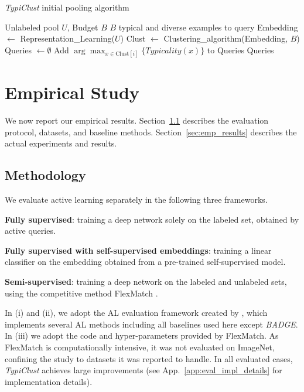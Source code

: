 \documentclass{article}
\newcommand{\app}{App.}
\begin{document}
\begin{algorithm}[hbt!]
\begin{algorithmic}
\caption{\emph{TypiClust} initial pooling algorithm}
\label{alg:initial_pool_selection}
     Unlabeled pool $U$, Budget $B$
     $B$ typical and diverse examples to query
    \STATE Embedding $\leftarrow$ Representation\_Learning($U$)
    \STATE Clust $\leftarrow$ Clustering\_algorithm(Embedding,  $B$)
    \STATE Queries $\leftarrow\emptyset$\;
\STATE Add $\arg\max_{x\in\text{Clust}[i]} \{Typicality(x)\}$ to Queries
    \ENDFOR
     Queries
\end{algorithmic}
\end{algorithm}


\section{Empirical Study}
\label{sec:emp}


We now report our empirical results. Section~\ref{sec:methodology} describes the evaluation protocol, datasets, and baseline methods. Section~\ref{sec:emp_results} describes the actual experiments and results.

\subsection{Methodology}
\label{sec:methodology}
We evaluate active learning separately in the following three frameworks.  \begin{inparaenum}[(i)] 
\item \textbf{Fully supervised}: training a deep network solely on the labeled set, obtained by active queries.
\item \textbf{Fully supervised with self-supervised embeddings}: training a linear classifier on the embedding obtained from a pre-trained self-supervised model. 
\item \textbf{Semi-supervised}: training a deep network on the labeled and unlabeled sets, using the competitive method FlexMatch \cite{DBLP:journals/corr/abs-2110-08263}.\end{inparaenum} 

In (i) and (ii), we adopt the AL evaluation framework created by \citet{Munjal2020TowardsRA}, which implements several AL methods including all baselines used here except \emph{BADGE}. In (iii) we adopt the code and hyper-parameters provided by FlexMatch. As FlexMatch is computationally intensive, it was not evaluated  on ImageNet, confining the study to datasets it was reported to handle. In all evaluated cases, \emph{TypiClust} achieves large improvements
(see \app~\ref{app:eval_impl_details} for implementation details). 
\end{document}
